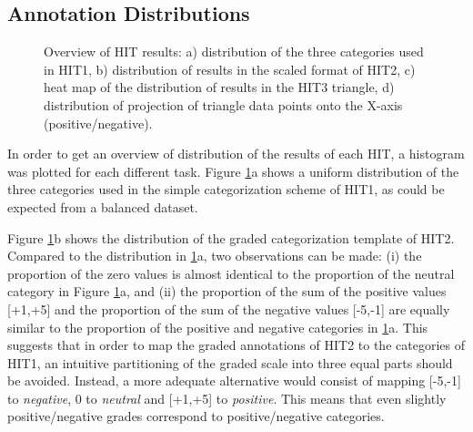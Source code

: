 \documentclass[11pt,letterpaper]{article}
\begin{document}
\subsection{Annotation Distributions}
\label{sect:distr}

\begin{figure}
  \begin{center}
	\caption{Overview of HIT results: a) distribution of the three categories used in HIT1, b) distribution of results in the scaled format of HIT2, c) heat map of the distribution of results in the HIT3 triangle, d) distribution of projection of triangle data points onto the X-axis (positive/negative).}
	\label{distr}
  \end{center}
\end{figure}

In order to get an overview of distribution of the results of each HIT, a histogram was plotted for each different task. Figure \ref{distr}a shows a uniform distribution of the three categories used in the simple categorization scheme of HIT1, as could be expected from a balanced dataset.

Figure \ref{distr}b shows the distribution of the graded categorization template of HIT2. Compared to the distribution in \ref{distr}a, two observations can be made: (i) the proportion of the zero values is almost identical to the proportion of the neutral category in Figure \ref{distr}a, and (ii) the proportion of the sum of the positive values [+1,+5] and the proportion of the sum of the negative values [-5,-1] are equally similar to the proportion of the positive and negative categories in \ref{distr}a. This suggests that in order to map the graded annotations of HIT2 to the categories of HIT1, an intuitive partitioning of the graded scale into three equal parts should be avoided. Instead, a more adequate alternative would consist of mapping [-5,-1] to \textit{negative}, 0 to \textit{neutral} and [+1,+5] to \textit{positive}. This means that even slightly positive/negative grades correspond to positive/negative categories.
\end{document}
